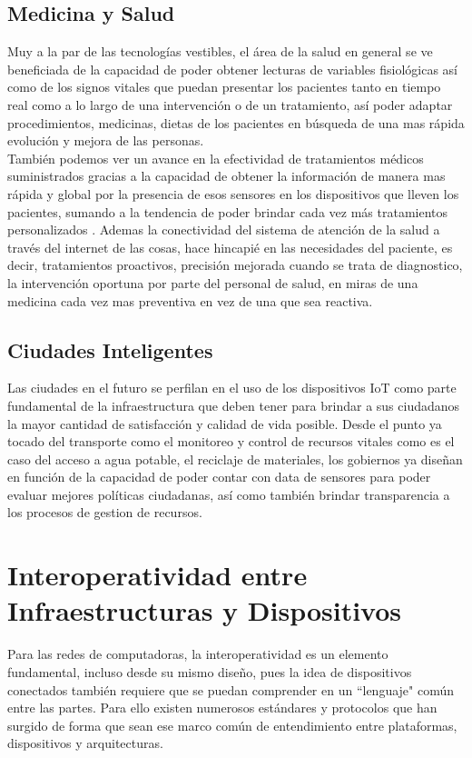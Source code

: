 \subsection{Medicina y Salud}
Muy a la par de las tecnologías vestibles, el área de la salud en general se ve beneficiada de la capacidad de poder obtener lecturas de variables fisiológicas así como de los signos vitales que puedan presentar los pacientes  tanto en tiempo real como a lo largo de una intervención o de un tratamiento, así poder adaptar procedimientos, medicinas, dietas de los pacientes en búsqueda de una mas rápida evolución y mejora de las personas.\\

También podemos ver un avance en la efectividad de tratamientos médicos suministrados gracias a la capacidad de obtener la información de manera mas rápida y global por la presencia de esos sensores en los dispositivos que lleven los pacientes, sumando a la tendencia de poder brindar cada vez más tratamientos personalizados \cite{ibmiotmedicina}. Ademas la conectividad del sistema de atención de la salud a través del internet de las cosas, hace hincapié en las necesidades del paciente, es decir, tratamientos proactivos, precisión mejorada cuando se trata de diagnostico, la intervención oportuna por parte del personal de salud, en miras de una medicina cada vez mas preventiva en vez de una que sea reactiva. 

\subsection{Ciudades Inteligentes}
Las ciudades en el futuro se perfilan en el uso de los dispositivos IoT como parte fundamental de la infraestructura que deben tener para brindar a sus ciudadanos la mayor cantidad de satisfacción y calidad de vida posible. Desde el punto ya tocado del transporte como el monitoreo y control de recursos vitales como es el caso del acceso a agua potable, el reciclaje de materiales, los gobiernos ya diseñan en función de la capacidad de poder contar con data de sensores para poder evaluar mejores políticas ciudadanas, así como también brindar transparencia a los procesos de gestion de recursos\cite{ibmiotciudad}. 

\section{Interoperatividad entre Infraestructuras y Dispositivos}
Para las redes de computadoras, la interoperatividad es un elemento fundamental, incluso desde su mismo diseño, pues la idea de dispositivos conectados también requiere que se puedan comprender en un ``lenguaje" común entre las partes. Para ello existen numerosos estándares y protocolos que han surgido de forma que sean ese marco común de entendimiento entre plataformas, dispositivos y arquitecturas.\\

